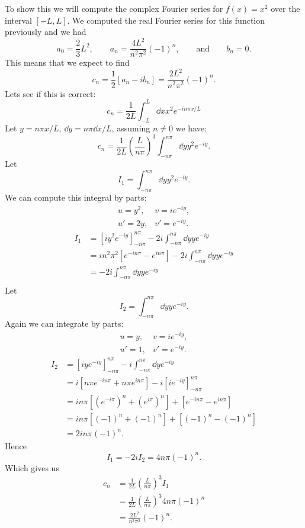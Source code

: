 \documentclass[a4paper]{article}
\begin{document}
    To show this we will compute the complex Fourier series for \(f(x) = x^2\) over the interval \([-L, L]\).
    We computed the real Fourier series for this function previously and we had
    \[a_0 = \frac{2}{3}L^2, \qquad a_n = \frac{4L^2}{n^2\pi^2}(-1)^n, \qquad\text{and}\qquad b_n = 0.\]
    This means that we expect to find
    \[c_n = \frac{1}{2}[a_n - ib_n] = \frac{2L^2}{n^2\pi^2}(-1)^n.\]
    Lets see if this is correct:
    \[c_n = \frac{1}{2L}\int_{-L}^{L} \dd{x} x^2 e^{-in\pi x/L}\]
    Let \(y = n\pi x/L\), \(\dd{y} = n\pi\dd{x}/L\), assuming \(n \ne 0\) we have:
    \[c_n = \frac{1}{2L}\left(\frac{L}{n\pi}\right)^3 \int_{-n\pi}^{n\pi} \dd{y} y^2 e^{-iy}.\]
    Let
    \[I_1 = \int_{-n\pi}^{n\pi} \dd{y} y^2e^{-iy}.\]
    We can compute this integral by parts:
    \[
        \begin{array}{ll}
            u = y^2, & v = ie^{-iy},\\
            u' = 2y, & v' = e^{-iy}.
        \end{array}
    \]
    \begin{align*}
        I_1 &= [iy^2e^{-iy}]_{-n\pi}^{n\pi} - 2i \int_{-n\pi}^{n\pi} \dd{y} ye^{-iy}\\
        &= in^2\pi^2[e^{-in\pi} - e^{in\pi}] - 2i \int_{-n\pi}^{n\pi} \dd{y} ye^{-iy}\\
        &= - 2i \int_{-n\pi}^{n\pi} \dd{y} ye^{-iy}\\
    \end{align*}
    Let
    \[I_2 = \int_{-n\pi}^{n\pi} \dd{y} ye^{-iy}.\]
    Again we can integrate by parts:
    \[
        \begin{array}{ll}
            u = y, & v = ie^{-iy},\\
            u' = 1, & v' = e^{-iy}.
        \end{array}
    \]
    \begin{align*}
        I_2 &= [iye^{-iy}]_{-n\pi}^{n\pi} - i\int_{-n\pi}^{n\pi} \dd{y} e^{-iy}\\
        &= i[n\pi e^{-in\pi} + n\pi e^{in\pi}] - i[ie^{-iy}]_{-n\pi}^{n\pi}\\
        &= in\pi[(e^{-i\pi})^n + (e^{i\pi})^n] + [e^{-in\pi} - e^{in\pi}]\\
        &= in\pi[(-1)^n + (-1)^n] + [(-1)^n - (-1)^n]\\
        &= 2in\pi (-1)^n.
    \end{align*}
    Hence
    \[I_1 = -2iI_2 = 4n\pi(-1)^n.\]
    Which gives us
    \begin{align*}
        c_n &= \frac{1}{2L}\left(\frac{L}{n\pi}\right)^3 I_1\\
        &= \frac{1}{2L}\left(\frac{L}{n\pi}\right)^3 4n\pi(-1)^n\\
        &= \frac{2L^2}{n^2\pi^2}(-1)^n.
    \end{align*}
\end{document}
